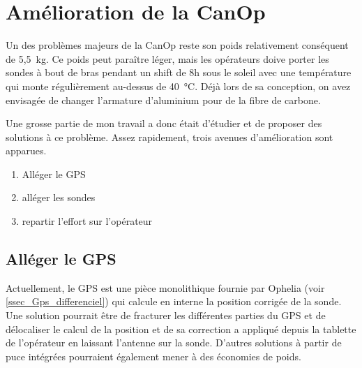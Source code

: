 \section{Amélioration de la CanOp}

Un des problèmes majeurs de la CanOp reste son poids relativement conséquent de 5,5~kg. Ce poids peut paraître léger, mais les opérateurs doive porter les sondes à bout de bras pendant un shift de 8h sous le soleil avec une température qui monte régulièrement au-dessus de 40~°C. Déjà lors de sa conception, on avez envisagée de changer l'armature d'aluminium pour de la fibre de carbone. 

Une grosse partie de mon travail a donc était d'étudier et de proposer des solutions à ce problème. Assez rapidement, trois avenues d'amélioration sont apparues.
\begin{enumerate}
    \item Alléger le GPS 
    \item alléger les sondes
    \item repartir l'effort sur l'opérateur
\end{enumerate}

\subsection{Alléger le GPS}
Actuellement, le GPS est une pièce monolithique fournie par Ophelia (voir \cref{ssec_Gps_differenciel}) qui calcule en interne la position corrigée de la sonde. Une solution pourrait être de fracturer les différentes parties du GPS et de délocaliser le calcul de la position et de sa correction a appliqué depuis la tablette de l'opérateur en laissant l'antenne sur la sonde. D'autres solutions à partir de puce intégrées pourraient également mener à des économies de poids.

